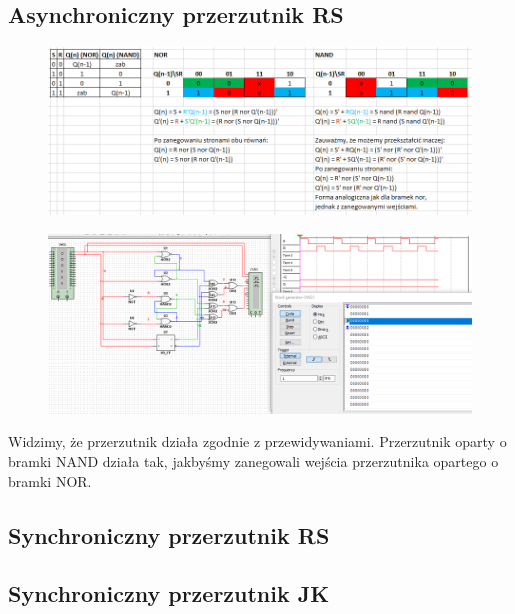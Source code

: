\documentclass[12pt,a4paper]{article}
\begin{document}
\subsection{Asynchroniczny przerzutnik RS}
\begin{figure}[H]
\centering
\includegraphics[width=\textwidth]{img/3a_karnaugh}
\end{figure}
\begin{figure}[H]
\centering
\includegraphics[width=\textwidth]{img/3a}
\end{figure}

Widzimy, że przerzutnik działa zgodnie z przewidywaniami. Przerzutnik oparty o bramki NAND działa tak, jakbyśmy zanegowali wejścia przerzutnika opartego o bramki NOR.

\subsection{Synchroniczny przerzutnik RS}



\subsection{Synchroniczny przerzutnik JK}
\end{document}
